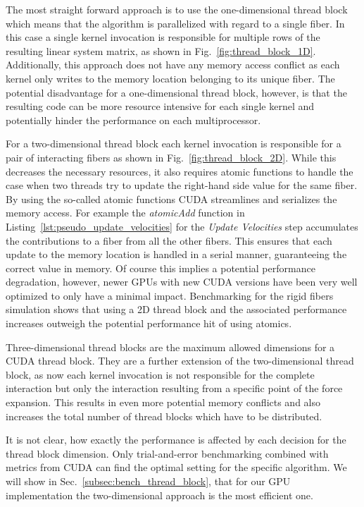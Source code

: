 The most straight forward approach is to use the one-dimensional thread block which means that the algorithm is parallelized with regard to a single fiber. In this case a single kernel invocation is responsible for multiple rows of the resulting linear system matrix, as shown in Fig.~\ref{fig:thread_block_1D}. Additionally, this approach does not have any memory access conflict as each kernel only writes to the memory location belonging to its unique fiber. The potential disadvantage for a one-dimensional thread block, however, is that the resulting code can be more resource intensive for each single kernel and potentially hinder the performance on each multiprocessor.

For a two-dimensional thread block each kernel invocation is responsible for a pair of interacting fibers as shown in Fig.~\ref{fig:thread_block_2D}. While this decreases the necessary resources, it also requires atomic functions to handle the case when two threads try to update the right-hand side value for the same fiber. By using the so-called atomic functions CUDA streamlines and serializes the memory access. For example the \emph{atomicAdd} function in Listing~\ref{lst:pseudo_update_velocities} for the \emph{Update Velocities} step accumulates the contributions to a fiber from all the other fibers. This ensures that each update to the memory location is handled in a serial manner, guaranteeing the correct value in memory. Of course this implies a potential performance degradation, however, newer GPUs with new CUDA versions have been very well optimized to only have a minimal impact. Benchmarking for the rigid fibers simulation shows that using a 2D thread block and the associated performance increases outweigh the potential performance hit of using atomics.

Three-dimensional thread blocks are the maximum allowed dimensions for a CUDA thread block. They are a further extension of the two-dimensional thread block, as now each kernel invocation is not responsible for the complete interaction but only the interaction resulting from a specific point of the force expansion. This results in even more potential memory conflicts and also increases the total number of thread blocks which have to be distributed.

It is not clear, how exactly the performance is affected by each decision for the thread block dimension. Only trial-and-error benchmarking combined with metrics from CUDA can find the optimal setting for the specific algorithm. We will show in Sec.~\ref{subsec:bench_thread_block}, that for our GPU implementation the two-dimensional approach is the most efficient one.

